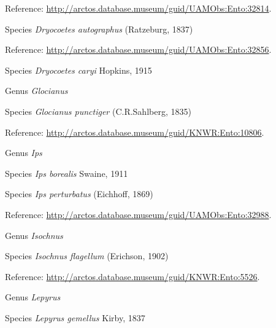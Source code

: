 \documentclass[9pt, article]{memoir}
\begin{document}
\begin{multicols}{2}
Reference: 
\url{http://arctos.database.museum/guid/UAMObs:Ento:32814}.

\vspace{6pt}\noindent\hspace{36pt}Species \textit{Dryocoetes autographus} (Ratzeburg, 1837)


Reference: 
\url{http://arctos.database.museum/guid/UAMObs:Ento:32856}.

\vspace{6pt}\noindent\hspace{36pt}Species \textit{Dryocoetes caryi} Hopkins, 1915


\vspace{6pt}\noindent\hspace{30pt}Genus \textit{Glocianus}


\vspace{6pt}\noindent\hspace{36pt}Species \textit{Glocianus punctiger} (C.R.Sahlberg, 1835)


Reference: 
\url{http://arctos.database.museum/guid/KNWR:Ento:10806}.

\vspace{6pt}\noindent\hspace{30pt}Genus \textit{Ips}


\vspace{6pt}\noindent\hspace{36pt}Species \textit{Ips borealis} Swaine, 1911


\vspace{6pt}\noindent\hspace{36pt}Species \textit{Ips perturbatus} (Eichhoff, 1869)


Reference: 
\url{http://arctos.database.museum/guid/UAMObs:Ento:32988}.

\vspace{6pt}\noindent\hspace{30pt}Genus \textit{Isochnus}


\vspace{6pt}\noindent\hspace{36pt}Species \textit{Isochnus flagellum} (Erichson, 1902)


Reference: 
\url{http://arctos.database.museum/guid/KNWR:Ento:5526}.

\vspace{6pt}\noindent\hspace{30pt}Genus \textit{Lepyrus}


\vspace{6pt}\noindent\hspace{36pt}Species \textit{Lepyrus gemellus} Kirby, 1837



\end{multicols}
\end{document}
